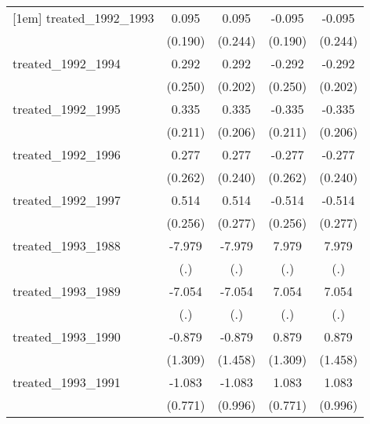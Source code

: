 {\begin{tabular}{l*{4}{c}}
[1em]
treated\_1992\_1993&       0.095         &       0.095         &      -0.095         &      -0.095         \\
            &     (0.190)         &     (0.244)         &     (0.190)         &     (0.244)         \\
[1em]
treated\_1992\_1994&       0.292         &       0.292         &      -0.292         &      -0.292         \\
            &     (0.250)         &     (0.202)         &     (0.250)         &     (0.202)         \\
[1em]
treated\_1992\_1995&       0.335         &       0.335         &      -0.335         &      -0.335         \\
            &     (0.211)         &     (0.206)         &     (0.211)         &     (0.206)         \\
[1em]
treated\_1992\_1996&       0.277         &       0.277         &      -0.277         &      -0.277         \\
            &     (0.262)         &     (0.240)         &     (0.262)         &     (0.240)         \\
[1em]
treated\_1992\_1997&       0.514\sym{*}  &       0.514         &      -0.514\sym{*}  &      -0.514         \\
            &     (0.256)         &     (0.277)         &     (0.256)         &     (0.277)         \\
[1em]
treated\_1993\_1988&      -7.979         &      -7.979         &       7.979         &       7.979         \\
            &         (.)         &         (.)         &         (.)         &         (.)         \\
[1em]
treated\_1993\_1989&      -7.054         &      -7.054         &       7.054         &       7.054         \\
            &         (.)         &         (.)         &         (.)         &         (.)         \\
[1em]
treated\_1993\_1990&      -0.879         &      -0.879         &       0.879         &       0.879         \\
            &     (1.309)         &     (1.458)         &     (1.309)         &     (1.458)         \\
[1em]
treated\_1993\_1991&      -1.083         &      -1.083         &       1.083         &       1.083         \\
            &     (0.771)         &     (0.996)         &     (0.771)         &     (0.996)         \\

\end{tabular}}
